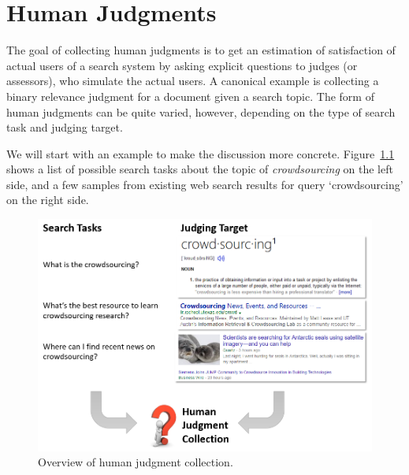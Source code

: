 
\chapter{Human Judgments}
\label{c-human-judgment}

The goal of collecting human judgments is to get an estimation of satisfaction of actual users of a search system by asking explicit questions to judges (or assessors), who simulate the actual users.  
 A canonical example is collecting a binary relevance judgment for a document given a  search topic. The form of human judgments can be quite varied, however, depending on the type of search task and judging target.

We will start with an example to make the discussion more concrete. Figure~\ref{fig:human_judgment_overview} shows a list of possible search tasks about the topic of \textit{crowdsourcing} on the left side, and a few samples from existing web search results for query `crowdsourcing' on the right side.

%

\begin{figure}
	\begin{center}
		\includegraphics[scale=0.5]{images/human_judgment_overview}
		\caption{Overview of human judgment collection.} 
		\label{fig:human_judgment_overview}
	\end{center}
\end{figure}

